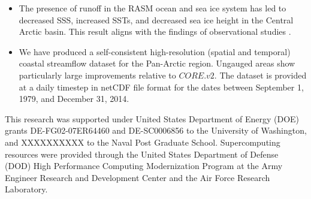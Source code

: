 \documentclass[jgrga, draft]{agutex}
\begin{document}
\begin{article}
\begin{itemize}[leftmargin=+.5in]
  \item The presence of runoff in the RASM ocean and sea ice system has led to decreased SSS, increased SSTs, and decreased sea ice height in the Central Arctic basin.
  This result aligns with the findings of observational studies \citep[e.g.][]{Morison_2012}.
  \item We have produced a self-consistent high-resolution (spatial and temporal) coastal streamflow dataset for the Pan-Arctic region.
  Ungauged areas show particularly large improvements relative to $CORE.v2$.
  The dataset is provided at a daily timestep in netCDF file format for the dates between September 1, 1979, and December 31, 2014.
\end{itemize}




%
%
%


\begin{acknowledgments}
This research was supported under United States Department of Energy (DOE) grants DE-FG02-07ER64460 and DE-SC0006856 to the University of Washington, and XXXXXXXXXX to the Naval Post Graduate School.
Supercomputing resources were provided through the United States Department of Defense (DOD) High Performance Computing Modernization Program at the Army Engineer Research and Development Center and the Air Force Research Laboratory.
\end{acknowledgments}





%
%
\end{article}
\end{document}
